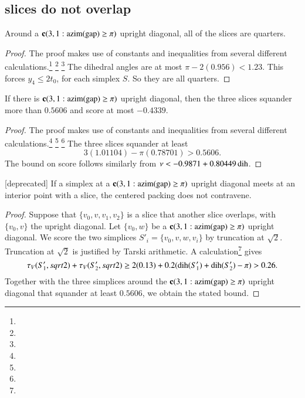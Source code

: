 
\subsection{slices do not overlap} %




\begin{lemma}\label{lemma:slice-quarter}
Around a ${\operatorname{\bf c}}{(3,1: {\operatorname{azim}}({\operatorname{gap}}) \ge \pi)}$ upright diagonal, all of the slices
are quarters.
\end{lemma}

\begin{proof}  The proof makes use of constants and inequalities from
several different calculations.\footnote{} %
\footnote{} %
\footnote{} %
The dihedral angles are at most $\pi-
2(0.956) < 1.23$. This forces $y_4\le 2t_0$, for each simplex $S$.
So they are all quarters.
\end{proof}

\begin{lemma}\label{lemma:3-crowded}
If there is ${\operatorname{\bf c}}{(3,1: {\operatorname{azim}}({\operatorname{gap}}) \ge \pi)}$ upright diagonal, then the three 
slices squander more than $0.5606$ and score at most $-0.4339$.
\end{lemma}


\begin{proof}  The proof makes use of constants and inequalities from
several different calculations.\footnote{} %
\footnote{} %
\footnote{} %
The three slices squander at
least
    $$
    3 (1.01104) - \pi (0.78701) > 0.5606.
    $$
The bound on score follows similarly from $\nu<-0.9871+0.80449\operatorname{dih}$.
\end{proof}

\begin{lemma}[deprecated]
If a simplex at a ${\operatorname{\bf c}}{(3,1: {\operatorname{azim}}({\operatorname{gap}}) \ge \pi)}$ upright diagonal meets at an
interior point with a slice, the centered packing does
not contravene.
\end{lemma}

\begin{proof}
Suppose that $\{v_0,v,v_1,v_2\}$ is a slice that another
slice overlaps, with $\{v_0,v\}$ the upright diagonal.  Let
$\{v_0,w\}$ be a ${\operatorname{\bf c}}{(3,1: {\operatorname{azim}}({\operatorname{gap}}) \ge \pi)}$ upright diagonal. We score the two
simplices $S'_i = \{v_0,v,w,v_i\}$ by truncation at $\sqrt{2}$.
Truncation at $\sqrt{2}$ is justified by Tarski arithmetic.
A calculation\footnote{} %
gives
    $$\tau_V(S'_1,sqrt{2})+\tau_V(S'_2,sqrt{2})\ge 2(0.13) +
        0.2(\operatorname{dih}(S'_1)+\operatorname{dih}(S'_2)-\pi) > 0.26.
    $$
Together with the three simplices around the ${\operatorname{\bf c}}{(3,1: {\operatorname{azim}}({\operatorname{gap}}) \ge \pi)}$ upright
diagonal that squander at least $0.5606$, we obtain the stated
bound.
\end{proof}

